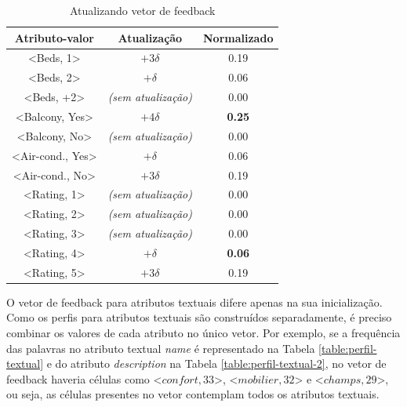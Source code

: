\begin{table}[]
	\centering
	\begin{tabular}{|c|c|c|}
	\hline
	\textbf{Atributo-valor}               & \textbf{Atualização} & \textbf{Normalizado} \\ \hline
	\textless{}Beds, 1\textgreater{}                   & $+3\delta$                       & 0.19                 \\ \hline
	\textless{}Beds, 2\textgreater{}                 & $+\delta$                       & 0.06                 \\ \hline
	\textless{}Beds, +2\textgreater{}                  & {\em (sem atualização)}                       & 0.00                    \\ \hline
	\textless{}Balcony, Yes\textgreater{}                   & $+4\delta$                      & {\bf 0.25}                 \\ \hline
	\textless{}Balcony, No\textgreater{}                    & {\em (sem atualização)}                        & 0.00                    \\ \hline
	\textless{}Air-cond., Yes\textgreater{}               & $+\delta$                       & 0.06                 \\ \hline
	\textless{}Air-cond., No\textgreater{}                & $+3\delta$                       & 0.19                 \\ \hline
	\textless{}Rating, 1\textgreater{}                    & {\em (sem atualização)}                       & 0.00                    \\ \hline
	\textless{}Rating, 2\textgreater{}                     & {\em (sem atualização)}                        & 0.00                    \\ \hline
	\textless{}Rating, 3\textgreater{}                    & {\em (sem atualização)}                        & 0.00                   \\ \hline
	\textless{}Rating, 4\textgreater{}                   & $+\delta$                       & {\bf 0.06}                 \\ \hline
	\textless{}Rating, 5\textgreater{}                     & $+3\delta$                      & 0.19                 \\ \hline
	\end{tabular}
	\caption{Atualizando vetor de feedback}
	\label{table:feedback}
\end{table}


O vetor de feedback para atributos textuais difere apenas na sua inicialização. Como os perfis para atributos textuais são construídos separadamente, é preciso combinar os valores de cada atributo no único vetor. Por exemplo, se a frequência das palavras no atributo textual {\em name} é representado na Tabela \ref{table:perfil-textual} e do atributo {\em description} na Tabela \ref{table:perfil-textual-2}, no vetor de feedback haveria células como \textless{}$confort, 33$\textgreater{}, \textless{}$mobilier, 32$\textgreater{} e \textless{}$champs, 29$\textgreater{}, ou seja, as células presentes no vetor contemplam todos os atributos textuais.


